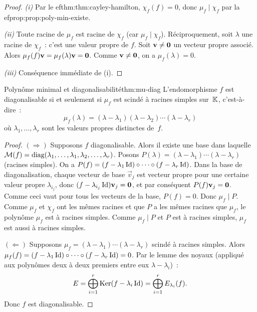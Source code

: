 \begin{proof}
  \emph{(i)} Par le 
ef{thm:thm:cayley-hamilton}, $\chi_f(f)=0$, donc
  $\mu_f\mid\chi_f$ par la 
ef{prop:prop:poly-min-existe}.

  \emph{(ii)} Toute racine de $\mu_f$ est racine de $\chi_f$ (car
  $\mu_f\mid\chi_f$). Réciproquement, soit $\lambda$ une racine de
  $\chi_f$~: c'est une valeur propre de $f$. Soit $\mathbf{v}\neq\mathbf{0}$
  un vecteur propre associé. Alors $\mu_f(f)\mathbf{v}=\mu_f(\lambda)\mathbf{v}
  =\mathbf{0}$. Comme $\mathbf{v}\neq\mathbf{0}$, on a $\mu_f(\lambda)=0$.

  \emph{(iii)} Conséquence immédiate de (i).
\end{proof}

\begin{theorem}{Polynôme minimal et diagonalisabilité}{thm:mu-diag}
  L'endomorphisme $f$ est diagonalisable si et seulement si $\mu_f$
  est scindé à racines simples sur~${\mathbb{K}}$, c'est-à-dire~:
  \[
    \mu_f(\lambda)=(\lambda-\lambda_1)(\lambda-\lambda_2)\cdots
    (\lambda-\lambda_r)
  \]
  où $\lambda_1,\ldots,\lambda_r$ sont les valeurs propres distinctes
  de~$f$.
\end{theorem}

\begin{proof}
  \emph{$(\Rightarrow)$} Supposons $f$ diagonalisable. Alors il existe
  une base dans laquelle
  $\mathcal{M}(f)=\operatorname{diag}(\lambda_1,\ldots,\lambda_1,\lambda_2,\ldots,\lambda_r)$.
  Posons $P(\lambda)=(\lambda-\lambda_1)\cdots(\lambda-\lambda_r)$
  (racines simples). On a
  $P(f)=(f-\lambda_1\operatorname{Id})\circ\cdots\circ(f-\lambda_r\operatorname{Id})$.
  Dans la base de diagonalisation, chaque vecteur de base $\vec{v}_j$
  est vecteur propre pour une certaine valeur propre $\lambda_{i_j}$,
  donc $(f-\lambda_{i_j}\operatorname{Id})\mathbf{v}_j=\mathbf{0}$, et par conséquent
  $P(f)\mathbf{v}_j=\mathbf{0}$. Comme ceci vaut pour tous les vecteurs de
  la base, $P(f)=0$. Donc $\mu_f\mid P$. Comme $\mu_f$ et $\chi_f$
  ont les mêmes racines et que $P$ a les mêmes racines que $\mu_f$,
  le polynôme $\mu_f$ est à racines simples. Comme $\mu_f\mid P$ et
  $P$ est à racines simples, $\mu_f$ est aussi à racines simples.

  \emph{$(\Leftarrow)$} Supposons
  $\mu_f=(\lambda-\lambda_1)\cdots(\lambda-\lambda_r)$ scindé à racines
  simples. Alors $\mu_f(f)=(f-\lambda_1\operatorname{Id})\circ\cdots\circ
  (f-\lambda_r\operatorname{Id})=0$. Par le lemme des noyaux (appliqué aux polynômes
  deux à deux premiers entre eux $\lambda-\lambda_i$)~:
  \[
    E=\bigoplus_{i=1}^r\operatorname{Ker}(f-\lambda_i\operatorname{Id})
    =\bigoplus_{i=1}^r E_{\lambda_i}(f).
  \]
  Donc $f$ est diagonalisable.
\end{proof}

